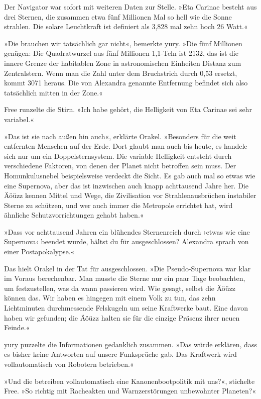 Der Navigator war sofort mit weiteren Daten zur Stelle. »Eta Carinae besteht aus drei Sternen, die zusammen etwa fünf Millionen Mal so hell wie die Sonne strahlen. Die solare Leuchtkraft ist definiert als 3,828 mal zehn hoch 26 Watt.«

»Die brauchen wir tatsächlich gar nicht«, bemerkte yury. »Die fünf Millionen genügen: Die Quadratwurzel aus fünf Millionen 1,1-Teln ist 2132, das ist die innere Grenze der habitablen Zone in astronomischen Einheiten Distanz zum Zentralstern. Wenn man die Zahl unter dem Bruchstrich durch 0,53 ersetzt, kommt 3071 heraus. Die von Alexandra genannte Entfernung befindet sich also tatsächlich mitten in der Zone.«

Free runzelte die Stirn. »Ich habe gehört, die Helligkeit von Eta Carinae sei sehr variabel.«

»Das ist sie nach außen hin auch«, erklärte Orakel. »Besonders für die weit entfernten Menschen auf der Erde. Dort glaubt man auch bis heute, es handele sich nur um ein Doppelsternsystem. Die variable Helligkeit entsteht durch verschiedene Faktoren, von denen der Planet nicht betroffen sein muss. Der Homunkulusnebel beispielsweise verdeckt die Sicht. Es gab auch mal so etwas wie eine Supernova, aber das ist inzwischen auch knapp achttausend Jahre her. Die Äöüzz kennen Mittel und Wege, die Zivilisation vor Strahlenausbrüchen instabiler Sterne zu schützen, und wer auch immer die Metropole errichtet hat, wird ähnliche Schutzvorrichtungen gehabt haben.«

»Dass vor achttausend Jahren ein blühendes Sternenreich durch ›etwas wie eine Supernova‹ beendet wurde, hältst du für ausgeschlossen? Alexandra sprach von einer Postapokalypse.«

Das hielt Orakel in der Tat für ausgeschlossen. »Die Pseudo-Supernova war klar im Voraus berechenbar. Man musste die Sterne nur ein paar Tage beobachten, um festzustellen, was da wann passieren wird. Wie gesagt, selbst die Äöüzz können das. Wir haben es hingegen mit einem Volk zu tun, das zehn Lichtminuten durchmessende Felskugeln um seine Kraftwerke baut. Eine davon haben wir gefunden; die Äöüzz halten sie für die einzige Präsenz ihrer neuen Feinde.«

yury puzzelte die Informationen gedanklich zusammen. »Das würde erklären, dass es bisher keine Antworten auf unsere Funksprüche gab. Das Kraftwerk wird vollautomatisch von Robotern betrieben.«

»Und die betreiben vollautomatisch eine Kanonenbootpolitik mit uns?«, stichelte Free. »So richtig mit Racheakten und Warnzerstörungen unbewohnter Planeten?«

